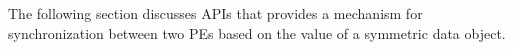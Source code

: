 The following section discusses \openshmem \ac{API}s that provides a mechanism for synchronization between two \ac{PE}s based on the value of a symmetric data object. 

